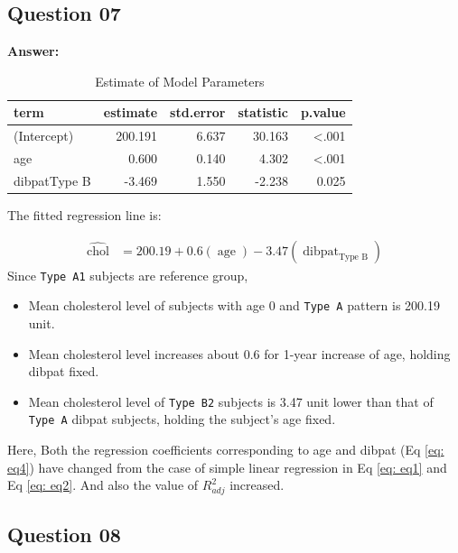 \documentclass[
  12pt,
  oneside]{article}
\providecommand{\tightlist}{%
  \setlength{\itemsep}{0pt}\setlength{\parskip}{0pt}}
\begin{document}
\hypertarget{question-07}{%
\subsection{Question 07}\label{question-07}}

\textbf{Answer:}

\begin{table}[H]

\caption{\label{tab:Table-09}Estimate of Model Parameters}
\centering
\begin{tabular}[t]{lrrrr}
\toprule
term & estimate & std.error & statistic & p.value\\
\midrule
(Intercept) & 200.191 & 6.637 & 30.163 & <.001\\
age & 0.600 & 0.140 & 4.302 & <.001\\
dibpatType B & -3.469 & 1.550 & -2.238 & 0.025\\
\bottomrule
\end{tabular}
\end{table}

The fitted regression line is:

\begin{equation}
\label{eq: eq4}
\begin{aligned}
\operatorname{\widehat{chol}} &= 200.19 + 0.6(\operatorname{age}) - 3.47(\operatorname{dibpat}_{\operatorname{Type\ B}})
\end{aligned}
\end{equation}
Since \texttt{Type\ A1} subjects are reference group,

\begin{itemize}
\tightlist
\item
  Mean cholesterol level of subjects with age 0 and \texttt{Type\ A} pattern is 200.19 unit.
\item
  Mean cholesterol level increases about 0.6 for 1-year increase of age, holding dibpat fixed.
\item
  Mean cholesterol level of \texttt{Type\ B2} subjects is 3.47 unit lower than that of \texttt{Type\ A} dibpat subjects, holding the subject's age fixed.
\end{itemize}

Here, Both the regression coefficients corresponding to age and dibpat (Eq \ref{eq: eq4}) have changed from the case of simple linear regression in Eq \ref{eq: eq1} and Eq \ref{eq: eq2}. And also the value of \(R^2_{adj}\) increased.

\hypertarget{question-08}{%
\subsection{Question 08}\label{question-08}}
\end{document}
